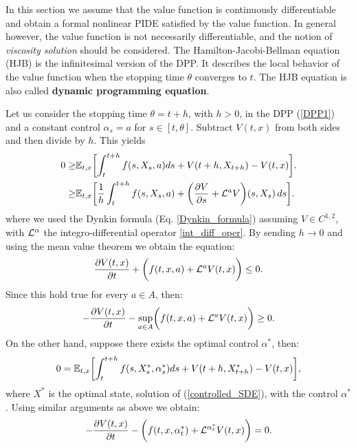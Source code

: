 In this section we assume that the value function is continuously differentiable and obtain a formal nonlinear PIDE satisfied by the value function.
In general however, the value function is not necessarily differentiable, and the notion of \emph{viscosity solution} should be considered.
The Hamilton-Jacobi-Bellman equation (HJB) is the infinitesimal version of the DPP. It describes the local behavior of the value function when the stopping time $\theta$ converges to $t$. 
The HJB equation is also called \textbf{dynamic programming equation}.
\newline

\noindent
Let us consider the stopping time $\theta = t + h$, with $h>0$, in the DPP (\ref{DPP1}) and a constant control $\alpha_s = a$ for $s \in [t,\theta]$. 
Subtract $V(t,x)$ from both sides and then divide by $h$. This yields
\begin{align*}
   0 \geq& \mathbb{E}_{t,x} \biggl[ \int_t^{t+h} f(s,X_s,a) ds + V(t+h, X_{t+h}) - V(t,x) \biggr]. \\ 
     \geq& \mathbb{E}_{t,x} \biggl[ \frac{1}{h} \int_t^{t+h} f(s,X_s,a) 
     + \biggl( \frac{\partial V}{\partial s} + \mathcal{L}^{a}V \biggr)(s, X_{s}) \, ds \biggr]. \\
\end{align*}
where we used the Dynkin formula (Eq. \ref{Dynkin_formula}) assuming $V \in C^{1,2}$, with $\mathcal{L}^{\alpha}$ the integro-differential operator \ref{int_diff_oper}.
By sending $h \to 0$ and using the mean value theorem we obtain the equation:
\begin{equation}
 \frac{\partial V(t,x)}{\partial t} + \biggl( f(t,x,a) + \mathcal{L}^{a}V(t,x)  \biggr) \leq 0.
\end{equation}
Since this hold true for every $a \in A$, then:
\begin{equation}
 -\frac{\partial V(t,x)}{\partial t} - \sup_{a \in A} \biggl( f(t,x,a) + \mathcal{L}^{a}V(t,x)  \biggr) \geq 0.
\end{equation}
On the other hand, suppose there exists the optimal control $\alpha^*$, then:
\begin{equation}
 0 = \mathbb{E}_{t,x} \biggl[ \int_t^{t+h} f(s,X^*_s,\alpha^*_s) ds + V(t+h, X^*_{t+h}) - V(t,x) \biggr],
\end{equation}
where $X^*$ is the optimal state, solution of (\ref{controlled_SDE}), with the control $\alpha^*$.
Using similar arguments as above we obtain:
\begin{equation}
 -\frac{\partial V(t,x)}{\partial t} - \biggl( f(t,x,\alpha_t^*) + \mathcal{L}^{\alpha_t^*} V(t,x)  \biggr) = 0.
\end{equation}
